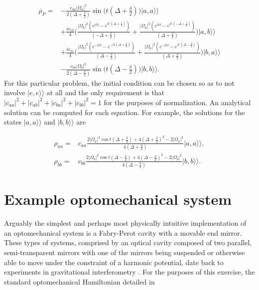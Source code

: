 \documentclass[12pt]{article}
\newcommand{\superket}[1]{|#1\rangle\rangle}
\begin{document}
\begin{align}
    \dot{\rho_P} =& -\frac{c_{aa}|\Omega_a|^2}{2(\Delta + \frac{\delta}{2})}\sin{\big( t(\Delta+\frac{\delta}{2})\big)}\superket{a,a}\\
&+\frac{i{c_{\ensuremath{\mathrm{12}}}}}{4}\Bigg(\frac{ |\Omega_b|^2 ( {{ e}^{ i t \delta }}-{{ e}^{ i t\, ( \Delta+\frac{\delta }{2} ) }}) }{ ( -\Delta + \frac{\delta}{2}  )  }+\frac{|\Omega_a|^2( {{ e}^{ i t \delta }}-{{ e}^{ i t\, (-\Delta+ \frac{\delta }{2} ) }}) }{ ( \Delta + \frac{\delta}{2}) }\Bigg)\superket{a,b}\nonumber\\
&+\frac{i{c_{\ensuremath{\mathrm{21}}}}}{4}\Bigg(\frac{ |\Omega_b|^2 ( {{ e}^{ -i t \delta }}-{{ e}^{ -i t ( \Delta+\frac{\delta }{2} ) }}) }{ ( \Delta - \frac{\delta}{2}  )  }+\frac{|\Omega_a|^2( {{ e}^{ -i t \delta }}-{{ e}^{ i t\, (\Delta- \frac{\delta }{2} ) }}) }{ ( \Delta + \frac{\delta}{2}) }\Bigg)\superket{b,a}\nonumber\\
&-\frac{c_{bb}|\Omega_b|^2}{2(\Delta - \frac{\delta}{2})}\sin{\big( t(\Delta-\frac{\delta}{2})\big)}\superket{b,b}.\nonumber
\end{align} For this particular problem, the initial condition can be chosen so as to not involve $\superket{e,e}$ at all and the only requirement is that $|c_{aa}|^2+|c_{ab}|^2+|c_{ba}|^2+|c_{bb}|^2=1$ for the purposes of normalization. An analytical solution can be computed for each equation. For example, the solutions for the states $\superket{a,a}$ and $\superket{b,b}$ are

\begin{align}
    \rho_{aa} =& c_{aa}\frac{2 |\Omega_a|^2 \cos{t(\Delta+\frac{\delta}{2}) }+4(\Delta+\frac{\delta}{2})^2 -2  |\Omega_a|^2}{4(\Delta+\frac{\delta}{2})}\superket{a,a},\\
    \rho_{bb} =& c_{bb}\frac{2  |\Omega_b|^2 \cos{t(\Delta-\frac{\delta}{2}) }+4(\Delta-\frac{\delta}{2})^2 -2  |\Omega_b|^2 }{4(\Delta-\frac{\delta}{2})}\superket{b,b}.
\end{align}


\section{Example optomechanical system}\label{sec:ExampleSystem}

Arguably the simplest and perhaps most physically intuitive implementation of an optomechanical system is a Fabry-Perot cavity with a movable end mirror. These types of systems, comprised by an optical cavity composed of two parallel, semi-transparent mirrors with one of the mirrors being suspended or otherwise able to move under the constraint of a harmonic potential, date back to experiments in gravitational interferometry \cite{AbramoviciLIGO1992}. For the purposes of this exercise,  the standard optomechanical Hamiltonian detailed in \cite{LawMovingMirror1995}
\end{document}
